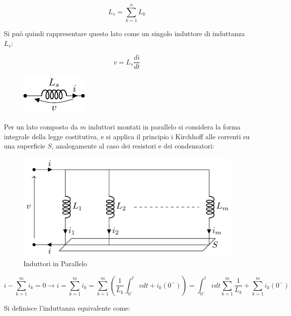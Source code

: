 \documentclass{article}
\numberwithin{equation}{subsection}
\begin{document}
\begin{equation*}
    L_s=\displaystyle\sum_{k=1}^nL_k
\end{equation*}

Si può quindi rappresentare questo lato come un singolo induttore di induttanza $L_s$:

\begin{equation}
    v=L_s\displaystyle\frac{di}{dt}
\end{equation}

\begin{figure}[H]%
    \centering
    \includegraphics{induttore-serie-equivalente.pdf}
    \label{fig:induttore-serie-equivalente}
\end{figure}



Per un lato composto da $m$ induttori montati in parallelo si considera la forma integrale della legge costitutiva, e si applica il principio i Kirchhoff alle correnti su una 
superficie $S$, analogamente al caso dei resistori e dei condensatori:

\begin{figure}[H]%
    \centering
    \includegraphics{induttore-parallelo.pdf}%
    \caption{Induttori in Parallelo}
    \label{fig:induttore-parallelo}
\end{figure}

\begin{equation*}
    i-\displaystyle\sum_{k=1}^mi_k=0\to i=\sum_{k=1}^mi_k=\sum_{k=1}^m\left(\frac{1}{L_k}\int_{0^-}^t vdt+i_k(0^-)\right)=\int_{0^-}^t vdt\sum_{k=1}^m\frac{1}{L_k}+\sum_{k=1}^mi_k(0^-)
\end{equation*}

Si definisce l'induttanza equivalente come:
\end{document}
